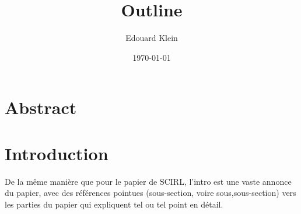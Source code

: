 \documentclass[11pt]{article}
\title{Outline}
\author{Edouard Klein}
\date{\today}
\begin{document}
\maketitle

\setcounter{tocdepth}{3}
\tableofcontents
\vspace*{1cm}
\section{Abstract}
\label{sec-1}
\section{Introduction}
\label{sec-2}

  De la même manière que pour le papier de SCIRL, l'intro est une vaste annonce du papier, avec des références pointues (sous-section, voire sous,sous-section) vers les parties du papier qui expliquent tel ou tel point en détail.
\end{document}
